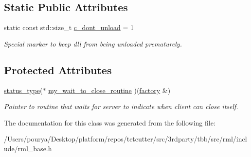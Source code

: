 \subsection*{Static Public Attributes}
\begin{DoxyCompactItemize}
\item 
\hypertarget{classrml_1_1factory_af2a2bf036a274ad5d7f5d8fc1709ad16}{}static const std\+::size\+\_\+t \hyperlink{classrml_1_1factory_af2a2bf036a274ad5d7f5d8fc1709ad16}{c\+\_\+dont\+\_\+unload} = 1\label{classrml_1_1factory_af2a2bf036a274ad5d7f5d8fc1709ad16}

\begin{DoxyCompactList}\small\item\em Special marker to keep dll from being unloaded prematurely. \end{DoxyCompactList}\end{DoxyCompactItemize}
\subsection*{Protected Attributes}
\begin{DoxyCompactItemize}
\item 
\hypertarget{classrml_1_1factory_ac6b17e29d9a1ca3a2934ca8eab9deeaa}{}\hyperlink{classrml_1_1factory_a4c1de6c79581a01b37d4ff16340e44c9}{status\+\_\+type}($\ast$ \hyperlink{classrml_1_1factory_ac6b17e29d9a1ca3a2934ca8eab9deeaa}{my\+\_\+wait\+\_\+to\+\_\+close\+\_\+routine} )(\hyperlink{classrml_1_1factory}{factory} \&)\label{classrml_1_1factory_ac6b17e29d9a1ca3a2934ca8eab9deeaa}

\begin{DoxyCompactList}\small\item\em Pointer to routine that waits for server to indicate when client can close itself. \end{DoxyCompactList}\end{DoxyCompactItemize}


The documentation for this class was generated from the following file\+:\begin{DoxyCompactItemize}
\item 
/\+Users/pourya/\+Desktop/platform/repos/tetcutter/src/3rdparty/tbb/src/rml/include/rml\+\_\+base.\+h\end{DoxyCompactItemize}
